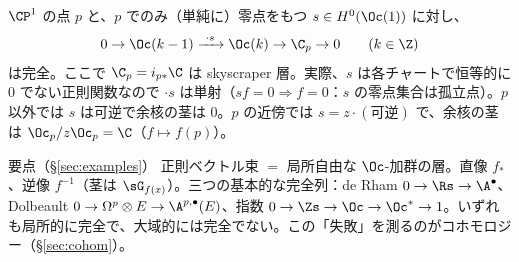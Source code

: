 \begin{ex}[点での完全列]\label{ex:skyscraperseq}\tP
$\CP^1$ の点 $p$ と、$p$ でのみ（単純に）零点をもつ $s\in H^0(\Oc(1))$ に対し、
\[
0\to\Oc(k-1)\xrightarrow{\ \cdot s\ }\Oc(k)\to\C_p\to0\qquad(k\in\Z)
\]
は完全。ここで $\C_p=i_{p*}\C$ は skyscraper 層。実際、$s$ は各チャートで恒等的に $0$ でない正則関数なので $\cdot s$ は単射（$sf=0\Rightarrow f=0$：$s$ の零点集合は孤立点）。$p$ 以外では $s$ は可逆で余核の茎は $0$。$p$ の近傍では $s=z\cdot(\text{可逆})$ で、余核の茎は $\Oc_p/z\Oc_p=\C$（$f\mapsto f(p)$）。
\end{ex}

\begin{keybox}{要点（§\ref{sec:examples}）}
正則ベクトル束 $=$ 局所自由な $\Oc$-加群の層。直像 $f_*$、逆像 $f^{-1}$（茎は $\sG_{f(x)}$）。三つの基本的な完全列：de Rham $0\to\Rs\to\A^\bullet$、Dolbeault $0\to\Omega^p\otimes E\to\A^{p,\bullet}(E)$、指数 $0\to\Zs\to\Oc\to\Oc^*\to1$。いずれも局所的に完全で、大域的には完全でない。この「失敗」を測るのがコホモロジー（§\ref{sec:cohom}）。
\end{keybox}

